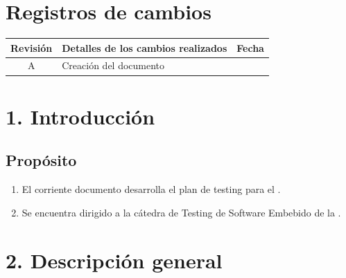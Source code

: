 \documentclass[
11pt, %
]{charter}
\begin{document}
\maketitle
\thispagestyle{empty}
\pagebreak


\thispagestyle{empty}
{\setlength{\parskip}{0pt}
\tableofcontents{}
}
\pagebreak


\section*{Registros de cambios}
\label{sec:registro}


\begin{table}[H]
\label{tab:registro}
\centering
\begin{tabularx}{\linewidth}{@{}|c|X|c|@{}}
\hline
\rowcolor[HTML]{C0C0C0} 
Revisión & \multicolumn{1}{c|}{\cellcolor[HTML]{C0C0C0}Detalles de los cambios realizados} & Fecha      \\ \hline
A      	& Creación del documento                            &\fechaInicioName 		\\ \hline

\end{tabularx}
\end{table}

\pagebreak

\section{1. Introducción}
\label{sec:introduccion}
\subsection{Propósito}
\begin{enumerate}
	\item	El corriente documento desarrolla el plan de testing para el \ttitle.
	\item 	Se encuentra dirigido a la cátedra de Testing de Software Embebido de la \degreename.
\end{enumerate}

\section{2. Descripción general}
\label{sec:descripcion_general}
\end{document}
